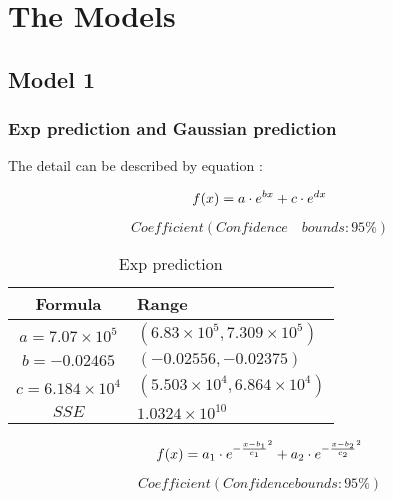\documentclass[12pt]{article}  %
\begin{document}
\section{The Models}
\subsection{Model 1}
\subsubsection{Exp prediction and Gaussian prediction}
The detail can be described by equation :

\begin{equation}
\large f(x)=a\cdot  e^{bx}+c\cdot e^{dx}
\end{equation}

$$Coefficient(Confidence \quad bounds: 95\%)$$
\begin{table}[!htbp]
	\begin{center}
		\caption{Exp prediction}
		\begin{tabular}{cl}
			\toprule
			\multicolumn{1}{m{3cm}}{\centering Formula}
			&\multicolumn{1}{m{8cm}}{\centering Range}\\
			\midrule
			$ a=7.07\times 10^{5}$ &   \qquad\qquad $(6.83\times 10^{5}, 7.309\times10^{5})$\\
			$ b=-0.02465 $ &   \qquad\qquad $(-0.02556, -0.02375)$\\
			$ c=6.184\times 10^{4}$ &  \qquad\qquad  $(5.503\times 10^{4}, 6.864\times 10^{4})$\\
			$ SSE$ &  \qquad\qquad  $1.0324\times 10^{10}$\\
			\bottomrule
		\end{tabular}\label{tb:notation}
	\end{center}
\end{table}

\begin{equation}
\large f(x) =  a_1\cdot e^{-\frac{x-b_1}{c_1}^2} + a_2\cdot e^{-\frac{x-b_2}{c_2}^2}
\end{equation}

$$Coefficient(Confidence bounds: 95\%)$$
\end{document}
